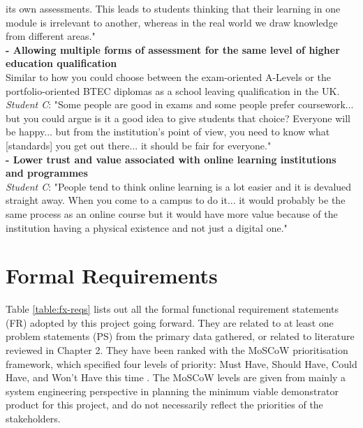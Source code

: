 its own assessments. This leads to students thinking that their learning in one module is irrelevant 
to another, whereas in the real world we draw knowledge from different areas."
\vspace{0.25cm}\\
\textbf{- Allowing multiple forms of assessment for the same level of higher education qualification}\\
Similar to how you could choose between the exam-oriented A-Levels or the portfolio-oriented BTEC diplomas 
as a school leaving qualification in the UK.\\
\textit{Student C}: "Some people are good in exams and some people prefer coursework... but you could 
argue is it a good idea to give students that choice? Everyone will be happy... but from the institution's 
point of view, you need to know what [standards] you get out there... it should be fair for everyone."
\vspace{0.25cm}\\
\textbf{- Lower trust and value associated with online learning institutions and programmes}\\
\textit{Student C}: "People tend to think online learning is a lot easier and it is devalued straight away. 
When you come to a campus to do it... it would probably be the same process as an online course but 
it would have more value because of the institution having a physical existence and not just a digital one."
\vspace{0.25cm}\\



\section{Formal Requirements}

Table \ref{table:fx-reqs} lists out all the formal functional requirement statements (FR) adopted by this 
project going forward. They are related to at least one problem statements (PS) from the primary data 
gathered, or related to literature reviewed in Chapter 2. They have been ranked with the MoSCoW prioritisation
framework, which specified four levels of priority: Must Have, Should Have, Could Have, and Won’t Have 
this time \citep{agile2018moscow}. The MoSCoW levels are given from mainly a system engineering perspective 
in planning the minimum viable demonstrator product for this project, and do not necessarily reflect 
the priorities of the stakeholders.


